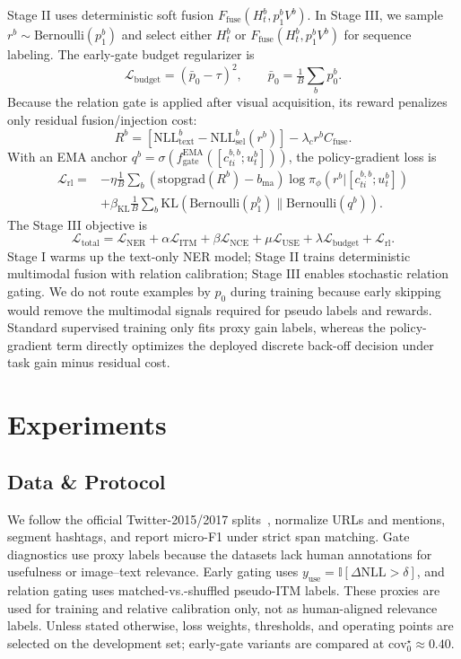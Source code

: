 \documentclass{llncs}
\newcommand{\Litm}{\mathcal{L}_{\mathrm{ITM}}}
\newcommand{\Lnce}{\mathcal{L}_{\mathrm{NCE}}}
\newcommand{\Luse}{\mathcal{L}_{\mathrm{USE}}} %
\newcommand{\Lner}{\mathcal{L}_{\mathrm{NER}}}
\newcommand{\Lbudget}{\mathcal{L}_{\mathrm{budget}}}
\newcommand{\Lrl}{\mathcal{L}_{\mathrm{rl}}}
\newcommand{\Ltotal}{\mathcal{L}_{\mathrm{total}}}
\newcommand{\KL}{\mathrm{KL}}
\newcommand{\Bern}{\mathrm{Bernoulli}}
\begin{document}
Stage II uses deterministic soft fusion $F_{\mathrm{fuse}}(H_t^b,p_1^bV^b)$. In Stage III, we sample $r^b\sim\Bern(p_1^b)$ and select either $H_t^b$ or $F_{\mathrm{fuse}}(H_t^b,p_1^bV^b)$ for sequence labeling. The early-gate budget regularizer is
\begin{equation}
\Lbudget=(\bar p_0-\tau)^2,\qquad \bar p_0=\tfrac{1}{B}\sum_b p_0^b.
\end{equation}
Because the relation gate is applied after visual acquisition, its reward penalizes only residual fusion/injection cost:
\begin{equation}
R^b=[\mathrm{NLL}_{\mathrm{text}}^b-\mathrm{NLL}_{\mathrm{sel}}^b(r^b)]-\lambda_c r^b C_{\mathrm{fuse}}.
\end{equation}
With an EMA anchor $q^b=\sigma(f_{\mathrm{gate}}^{\mathrm{EMA}}([c_{ti}^{b,b};u_t^b]))$, the policy-gradient loss is
\begin{align}
\Lrl=&-\eta\tfrac{1}{B}\sum_b(\mathrm{stopgrad}(R^b)-b_{\mathrm{ma}})
\log\pi_\phi(r^b|[c_{ti}^{b,b};u_t^b]) \\
&+\beta_{\mathrm{KL}}\tfrac{1}{B}\sum_b\KL(\Bern(p_1^b)\|\Bern(q^b)).
\end{align}
The Stage III objective is
\begin{equation}
\Ltotal=\Lner+\alpha\Litm+\beta\Lnce+\mu\Luse+\lambda\Lbudget+\Lrl.
\end{equation}
Stage I warms up the text-only NER model; Stage II trains deterministic multimodal fusion with relation calibration; Stage III enables stochastic relation gating. We do not route examples by $p_0$ during training because early skipping would remove the multimodal signals required for pseudo labels and rewards. Standard supervised training only fits proxy gain labels, whereas the policy-gradient term directly optimizes the deployed discrete back-off decision under task gain minus residual cost.

\section{Experiments}
\subsection{Data \& Protocol}
We follow the official Twitter-2015/2017 splits~\cite{lu_visual_2018,zhang_adaptive_2018}, normalize URLs and mentions, segment hashtags, and report micro-F1 under strict span matching. Gate diagnostics use proxy labels because the datasets lack human annotations for usefulness or image--text relevance. Early gating uses $y_{\mathrm{use}}=\mathbb{I}[\Delta\mathrm{NLL}>\delta]$, and relation gating uses matched-vs.-shuffled pseudo-ITM labels. These proxies are used for training and relative calibration only, not as human-aligned relevance labels. Unless stated otherwise, loss weights, thresholds, and operating points are selected on the development set; early-gate variants are compared at $\mathrm{cov}_0^\star\approx0.40$.
\end{document}
